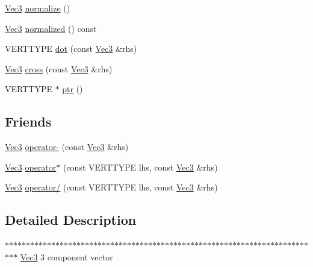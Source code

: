 \begin{DoxyCompactItemize}
\hyperlink{struct_vec3}{Vec3} \hyperlink{struct_vec3_addb4fc8b8f3a27a0b95d0a07fbb98a7a}{normalize} ()
\item 
\hyperlink{struct_vec3}{Vec3} \hyperlink{struct_vec3_a8a0ad811b0676d6374aed339f3c4f761}{normalized} () const 
\item 
VERTTYPE \hyperlink{struct_vec3_a023376cc99a6242ef1c29fcdd524f539}{dot} (const \hyperlink{struct_vec3}{Vec3} \&rhs)
\item 
\hyperlink{struct_vec3}{Vec3} \hyperlink{struct_vec3_a66159f5b4b7a94ea76960a8fc5c6258f}{cross} (const \hyperlink{struct_vec3}{Vec3} \&rhs)
\item 
VERTTYPE $\ast$ \hyperlink{struct_vec3_a101702fe80bc952ee0863025c57acfbc}{ptr} ()
\end{DoxyCompactItemize}
\subsection*{Friends}
\begin{DoxyCompactItemize}
\item 
\hyperlink{struct_vec3}{Vec3} \hyperlink{struct_vec3_a15e92ceaedb52c1548c61f172a8eebaf}{operator-\/} (const \hyperlink{struct_vec3}{Vec3} \&rhs)
\item 
\hyperlink{struct_vec3}{Vec3} \hyperlink{struct_vec3_ac785bebf82b971d858b37b05ae378ec9}{operator$\ast$} (const VERTTYPE lhs, const \hyperlink{struct_vec3}{Vec3} \&rhs)
\item 
\hyperlink{struct_vec3}{Vec3} \hyperlink{struct_vec3_a2dce2669678387453cb8c356eac6dffd}{operator/} (const VERTTYPE lhs, const \hyperlink{struct_vec3}{Vec3} \&rhs)
\end{DoxyCompactItemize}


\subsection{Detailed Description}
$\ast$$\ast$$\ast$$\ast$$\ast$$\ast$$\ast$$\ast$$\ast$$\ast$$\ast$$\ast$$\ast$$\ast$$\ast$$\ast$$\ast$$\ast$$\ast$$\ast$$\ast$$\ast$$\ast$$\ast$$\ast$$\ast$$\ast$$\ast$$\ast$$\ast$$\ast$$\ast$$\ast$$\ast$$\ast$$\ast$$\ast$$\ast$$\ast$$\ast$$\ast$$\ast$$\ast$$\ast$$\ast$$\ast$$\ast$$\ast$$\ast$$\ast$$\ast$$\ast$$\ast$$\ast$$\ast$$\ast$$\ast$$\ast$$\ast$$\ast$$\ast$$\ast$$\ast$$\ast$$\ast$$\ast$$\ast$$\ast$$\ast$$\ast$$\ast$$\ast$$\ast$$\ast$$\ast$ \hyperlink{struct_vec3}{Vec3} 3 component vector 

